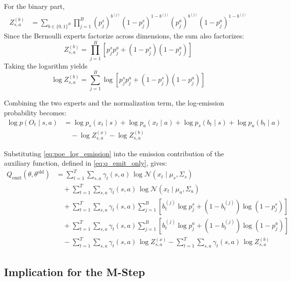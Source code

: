For the binary part,
\begin{align}
Z_{s,a}^{(b)}
&=
\sum_{b \in \{0,1\}^{B}}
\prod_{j=1}^{B}
(p_j^s)^{b^{(j)}}(1-p_j^s)^{1-b^{(j)}}
(p_j^a)^{b^{(j)}}(1-p_j^a)^{1-b^{(j)}}
\end{align}
Since the Bernoulli experts factorize across dimensions, the sum also factorizes:
\begin{equation}
Z_{s,a}^{(b)}
=
\prod_{j=1}^{B}
\left[
p_j^s p_j^a + (1-p_j^s)(1-p_j^a)
\right]
\label{eq:poe_zb_closed}
\end{equation}
Taking the logarithm yields
\begin{equation}
\log Z_{s,a}^{(b)}
=
\sum_{j=1}^{B}
\log
\left[
p_j^s p_j^a + (1-p_j^s)(1-p_j^a)
\right]
\end{equation}

Combining the two experts and the normalization term, the log-emission probability becomes:
\begin{align}
\log p(O_t \mid s,a)
&=
\log p_s(x_t \mid s)
+
\log p_a(x_t \mid a)
+
\log p_s(b_t \mid s)
+
\log p_a(b_t \mid a)
\nonumber\\
&\quad
-
\log Z_{s,a}^{(x)}
-
\log Z_{s,a}^{(b)}
\label{eq:poe_log_emission}
\end{align}


Substituting \eqref{eq:poe_log_emission} into the emission contribution of the auxiliary function,
defined in \eqref{eq:q_emit_only}, gives:
\begin{align}
Q_{\mathrm{emit}}(\theta,\theta^{\mathrm{old}})
&=
\sum_{t=1}^{T}\sum_{s,a}
\gamma_t(s,a)\,
\log \mathcal{N}(x_t \mid \mu_s,\Sigma_s)
\nonumber\\
&\quad+
\sum_{t=1}^{T}\sum_{s,a}
\gamma_t(s,a)\,
\log \mathcal{N}(x_t \mid \mu_a,\Sigma_a)
\nonumber\\
&\quad+
\sum_{t=1}^{T}\sum_{s,a}
\gamma_t(s,a)
\sum_{j=1}^{B}
\left[
b_t^{(j)}\log p_j^s + (1-b_t^{(j)})\log(1-p_j^s)
\right]
\nonumber\\
&\quad+
\sum_{t=1}^{T}\sum_{s,a}
\gamma_t(s,a)
\sum_{j=1}^{B}
\left[
b_t^{(j)}\log p_j^a + (1-b_t^{(j)})\log(1-p_j^a)
\right]
\nonumber\\
&\quad-
\sum_{t=1}^{T}\sum_{s,a}
\gamma_t(s,a)\,\log Z_{s,a}^{(x)}
-
\sum_{t=1}^{T}\sum_{s,a}
\gamma_t(s,a)\,\log Z_{s,a}^{(b)}
\label{eq:poe_qemit_expanded}
\end{align}

\subsection{Implication for the M-Step}

